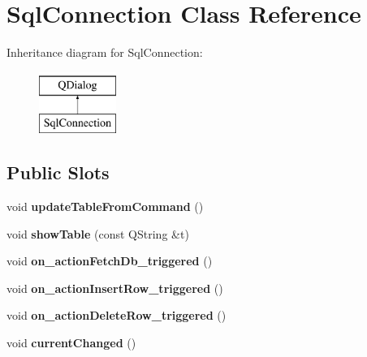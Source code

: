\hypertarget{classSqlConnection}{\section{Sql\-Connection Class Reference}
\label{classSqlConnection}
}
Inheritance diagram for Sql\-Connection\-:\begin{figure}[H]
\begin{center}
\leavevmode
\includegraphics[height=2.000000cm]{classSqlConnection}
\end{center}
\end{figure}
\subsection*{Public Slots}
\begin{DoxyCompactItemize}
\item 
\hypertarget{classSqlConnection_a82e3b42ecea79904550546acbcef70b7}{void {\bfseries update\-Table\-From\-Command} ()}\label{classSqlConnection_a82e3b42ecea79904550546acbcef70b7}

\item 
\hypertarget{classSqlConnection_ade9e50f4c19e51e1229c2c71f0ae7be4}{void {\bfseries show\-Table} (const Q\-String \&t)}\label{classSqlConnection_ade9e50f4c19e51e1229c2c71f0ae7be4}

\item 
\hypertarget{classSqlConnection_a42fec1968d2a28aed8a130a3851715ee}{void {\bfseries on\-\_\-action\-Fetch\-Db\-\_\-triggered} ()}\label{classSqlConnection_a42fec1968d2a28aed8a130a3851715ee}

\item 
\hypertarget{classSqlConnection_a585556486aefb0e01764c299678a7998}{void {\bfseries on\-\_\-action\-Insert\-Row\-\_\-triggered} ()}\label{classSqlConnection_a585556486aefb0e01764c299678a7998}

\item 
\hypertarget{classSqlConnection_a54e2f239aa237f1eed5e4c6023c2001a}{void {\bfseries on\-\_\-action\-Delete\-Row\-\_\-triggered} ()}\label{classSqlConnection_a54e2f239aa237f1eed5e4c6023c2001a}

\item 
\hypertarget{classSqlConnection_ac11db1288aa22bee6a645f006665558e}{void {\bfseries current\-Changed} ()}\label{classSqlConnection_ac11db1288aa22bee6a645f006665558e}

\end{DoxyCompactItemize}
